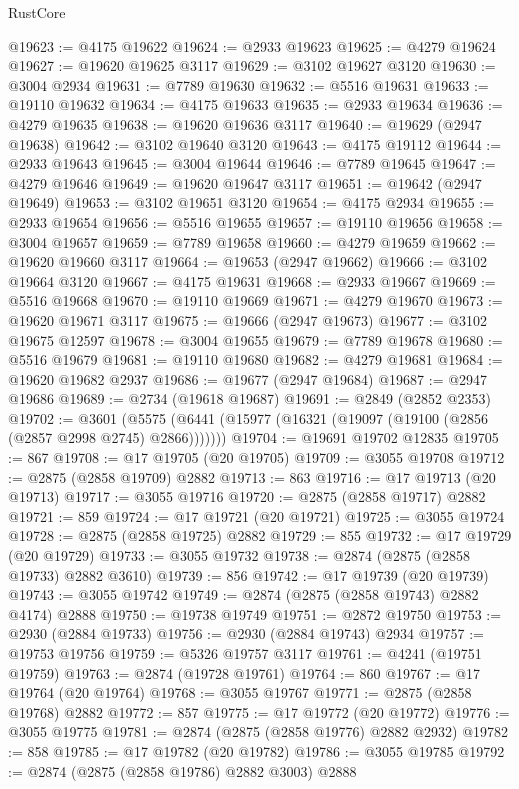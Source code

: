 \begin{lexlean}{RustCore}
\begin{coremodule}
@19623 := @4175 @19622
@19624 := @2933 @19623
@19625 := @4279 @19624
@19627 := @19620 @19625 @3117
@19629 := @3102 @19627 @3120
@19630 := @3004 @2934
@19631 := @7789 @19630
@19632 := @5516 @19631
@19633 := @19110 @19632
@19634 := @4175 @19633
@19635 := @2933 @19634
@19636 := @4279 @19635
@19638 := @19620 @19636 @3117
@19640 := @19629 (@2947 @19638)
@19642 := @3102 @19640 @3120
@19643 := @4175 @19112
@19644 := @2933 @19643
@19645 := @3004 @19644
@19646 := @7789 @19645
@19647 := @4279 @19646
@19649 := @19620 @19647 @3117
@19651 := @19642 (@2947 @19649)
@19653 := @3102 @19651 @3120
@19654 := @4175 @2934
@19655 := @2933 @19654
@19656 := @5516 @19655
@19657 := @19110 @19656
@19658 := @3004 @19657
@19659 := @7789 @19658
@19660 := @4279 @19659
@19662 := @19620 @19660 @3117
@19664 := @19653 (@2947 @19662)
@19666 := @3102 @19664 @3120
@19667 := @4175 @19631
@19668 := @2933 @19667
@19669 := @5516 @19668
@19670 := @19110 @19669
@19671 := @4279 @19670
@19673 := @19620 @19671 @3117
@19675 := @19666 (@2947 @19673)
@19677 := @3102 @19675 @12597
@19678 := @3004 @19655
@19679 := @7789 @19678
@19680 := @5516 @19679
@19681 := @19110 @19680
@19682 := @4279 @19681
@19684 := @19620 @19682 @2937
@19686 := @19677 (@2947 @19684)
@19687 := @2947 @19686
@19689 := @2734 (@19618 @19687)
@19691 := @2849 (@2852 @2353)
@19702 := @3601
    (@5575 (@6441 (@15977 (@16321 (@19097 (@19100 (@2856 (@2857 @2998 @2745) @2866)))))))
@19704 := @19691 @19702 @12835
@19705 := 867
@19708 := @17 @19705 (@20 @19705)
@19709 := @3055 @19708
@19712 := @2875 (@2858 @19709) @2882
@19713 := 863
@19716 := @17 @19713 (@20 @19713)
@19717 := @3055 @19716
@19720 := @2875 (@2858 @19717) @2882
@19721 := 859
@19724 := @17 @19721 (@20 @19721)
@19725 := @3055 @19724
@19728 := @2875 (@2858 @19725) @2882
@19729 := 855
@19732 := @17 @19729 (@20 @19729)
@19733 := @3055 @19732
@19738 := @2874 (@2875 (@2858 @19733) @2882 @3610)
@19739 := 856
@19742 := @17 @19739 (@20 @19739)
@19743 := @3055 @19742
@19749 := @2874 (@2875 (@2858 @19743) @2882 @4174) @2888
@19750 := @19738 @19749
@19751 := @2872 @19750
@19753 := @2930 (@2884 @19733)
@19756 := @2930 (@2884 @19743) @2934
@19757 := @19753 @19756
@19759 := @5326 @19757 @3117
@19761 := @4241 (@19751 @19759)
@19763 := @2874 (@19728 @19761)
@19764 := 860
@19767 := @17 @19764 (@20 @19764)
@19768 := @3055 @19767
@19771 := @2875 (@2858 @19768) @2882
@19772 := 857
@19775 := @17 @19772 (@20 @19772)
@19776 := @3055 @19775
@19781 := @2874 (@2875 (@2858 @19776) @2882 @2932)
@19782 := 858
@19785 := @17 @19782 (@20 @19782)
@19786 := @3055 @19785
@19792 := @2874 (@2875 (@2858 @19786) @2882 @3003) @2888

\end{coremodule}
\end{lexlean}
